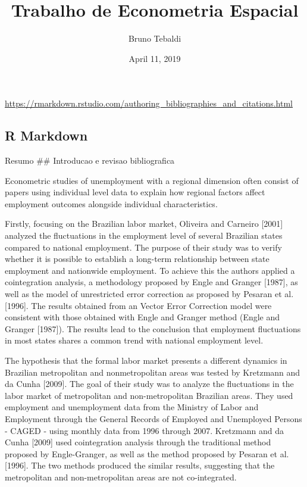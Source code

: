 \documentclass[]{article}
\title{Trabalho de Econometria Espacial}
\author{Bruno Tebaldi}
\date{April 11, 2019}
\begin{document}
\maketitle

\url{https://rmarkdown.rstudio.com/authoring_bibliographies_and_citations.html}

\subsection{R Markdown}\label{r-markdown}

Resumo \#\# Introducao e revisao bibliografica

Econometric studies of unemployment with a regional dimension often
consist of papers using individual level data to explain how regional
factors affect employment outcomes alongside individual characteristics.

Firstly, focusing on the Brazilian labor market, Oliveira and Carneiro
{[}2001{]} analyzed the fluctuations in the employment level of several
Brazilian states compared to national employment. The purpose of their
study was to verify whether it is possible to establish a long-term
relationship between state employment and nationwide employment. To
achieve this the authors applied a cointegration analysis, a methodology
proposed by Engle and Granger {[}1987{]}, as well as the model of
unrestricted error correction as proposed by Pesaran et al. {[}1996{]}.
The results obtained from an Vector Error Correction model were
consistent with those obtained with Engle and Granger method (Engle and
Granger {[}1987{]}). The results lead to the conclusion that employment
fluctuations in most states shares a common trend with national
employment level.

The hypothesis that the formal labor market presents a different
dynamics in Brazilian metropolitan and nonmetropolitan areas was tested
by Kretzmann and da Cunha {[}2009{]}. The goal of their study was to
analyze the fluctuations in the labor market of metropolitan and
non-metropolitan Brazilian areas. They used employment and unemployment
data from the Ministry of Labor and Employment through the General
Records of Employed and Unemployed Persons - CAGED - using monthly data
from 1996 through 2007. Kretzmann and da Cunha {[}2009{]} used
cointegration analysis through the traditional method proposed by
Engle-Granger, as well as the method proposed by Pesaran et al.
{[}1996{]}. The two methods produced the similar results, suggesting
that the metropolitan and non-metropolitan areas are not co-integrated.
\end{document}
